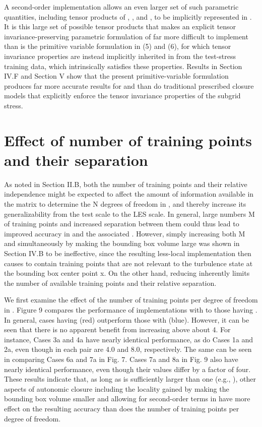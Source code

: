 A second-order implementation allows an even larger set of such parametric quantities, including tensor products of  ,  ,   and  , to be implicitly represented in  . It is this large set of possible tensor products that makes an explicit tensor invariance-preserving parametric formulation of   far more difficult to implement than is the primitive variable formulation in (5) and (6), for which tensor invariance properties are instead implicitly inherited in   from the test-stress training data, which intrinsically satisfies these properties. Results in Section IV.F and Section V show that the present primitive-variable formulation produces far more accurate results for   and   than do traditional prescribed closure models that explicitly enforce the tensor invariance properties of the subgrid stress.

\section{Effect of number of training points and their separation}

As noted in Section II.B, both the number of training points and their relative independence might be expected to affect the amount of information available in the   matrix to determine the N degrees of freedom in  , and thereby increase its generalizability from the test scale to the LES scale. In general, large numbers M of training points and increased separation   between them could thus lead to improved accuracy in   and the associated  . However, simply increasing both M and   simultaneously by making the bounding box volume   large was shown in Section IV.B to be ineffective, since the resulting less-local implementation then causes   to contain training points that are not relevant to the turbulence state at the bounding box center point x. On the other hand, reducing   inherently limits the number of available training points and their relative separation. 

We first examine the effect of the number   of training points per degree of freedom 
in  . Figure 9 compares the performance of implementations with   to those having  . In general, cases having   (red) outperform those with   (blue). However, it can be seen that there is no apparent benefit from increasing  above about 4. For instance, Cases 3a and 4a have nearly identical performance, as do Cases 1a and 2a, even though   in each pair are 4.0 and 8.0, respectively. The same can be seen in comparing Cases 6a and 7a in Fig. 7. Cases 7a and 8a in Fig. 9 also have nearly identical performance, even though their  values differ by a factor of four. These results indicate that, as long as   is sufficiently larger than one (e.g.,  ), other aspects of autonomic closure including the locality gained by making the bounding box volume   smaller and allowing for second-order terms in   have more effect on the resulting accuracy than does the number of training points per degree of freedom.


